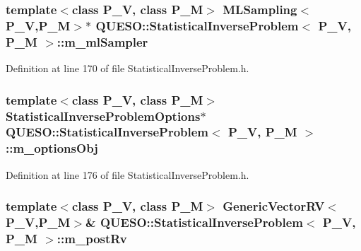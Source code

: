 \hypertarget{class_q_u_e_s_o_1_1_statistical_inverse_problem_a8410eadca0a84c3ee1ad2e934a2c6d10}{
\subsubsection[{m\-\_\-ml\-Sampler}]{\setlength{\rightskip}{0pt plus 5cm}template$<$class P\-\_\-\-V, class P\-\_\-\-M$>$ {\bf M\-L\-Sampling}$<$P\-\_\-\-V,P\-\_\-\-M$>$$\ast$ {\bf Q\-U\-E\-S\-O\-::\-Statistical\-Inverse\-Problem}$<$ P\-\_\-\-V, P\-\_\-\-M $>$\-::m\-\_\-ml\-Sampler\hspace{0.3cm}{\ttfamily [private]}}}\label{class_q_u_e_s_o_1_1_statistical_inverse_problem_a8410eadca0a84c3ee1ad2e934a2c6d10}


Definition at line 170 of file Statistical\-Inverse\-Problem.\-h.

\hypertarget{class_q_u_e_s_o_1_1_statistical_inverse_problem_a481954f01d55bab4c1a36392fecb4a12}{
\subsubsection[{m\-\_\-options\-Obj}]{\setlength{\rightskip}{0pt plus 5cm}template$<$class P\-\_\-\-V, class P\-\_\-\-M$>$ {\bf Statistical\-Inverse\-Problem\-Options}$\ast$ {\bf Q\-U\-E\-S\-O\-::\-Statistical\-Inverse\-Problem}$<$ P\-\_\-\-V, P\-\_\-\-M $>$\-::m\-\_\-options\-Obj\hspace{0.3cm}{\ttfamily [private]}}}\label{class_q_u_e_s_o_1_1_statistical_inverse_problem_a481954f01d55bab4c1a36392fecb4a12}


Definition at line 176 of file Statistical\-Inverse\-Problem.\-h.

\hypertarget{class_q_u_e_s_o_1_1_statistical_inverse_problem_a7dc62223cad355422449841ff3ec68e4}{
\subsubsection[{m\-\_\-post\-Rv}]{\setlength{\rightskip}{0pt plus 5cm}template$<$class P\-\_\-\-V, class P\-\_\-\-M$>$ {\bf Generic\-Vector\-R\-V}$<$P\-\_\-\-V,P\-\_\-\-M$>$\& {\bf Q\-U\-E\-S\-O\-::\-Statistical\-Inverse\-Problem}$<$ P\-\_\-\-V, P\-\_\-\-M $>$\-::m\-\_\-post\-Rv\hspace{0.3cm}{\ttfamily [private]}}}\label{class_q_u_e_s_o_1_1_statistical_inverse_problem_a7dc62223cad355422449841ff3ec68e4}


